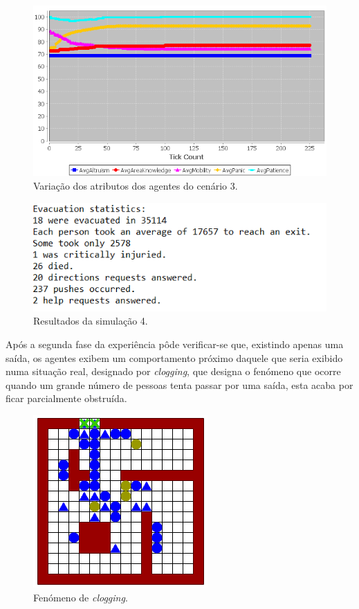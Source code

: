 \documentclass[12pt]{article}
\begin{document}
\begin{titlepage}
\begin{itemize}
\begin{figure}[H]
	\centering
	\includegraphics{graph_sc3.png}
	\caption{Variação dos atributos dos agentes do cenário 3.}
	\label{graph_sc3}
\end{figure}

\begin{figure}[H]
	\centering
	\includegraphics{log_sc4.png}
	\caption{Resultados da simulação 4.}
	\label{log_sc4}
\end{figure}

Após a segunda fase da experiência pôde verificar-se que, existindo apenas uma saída, os agentes exibem um comportamento próximo daquele que seria exibido numa situação real, designado por \textit{clogging}, que designa o fenómeno que ocorre quando um grande número de pessoas tenta passar por uma saída, esta acaba por ficar parcialmente obstruída. 

\begin{figure}[H]
	\centering
	\includegraphics[scale=1.1]{clogging.png}
	\caption{Fenómeno de \textit{clogging}.}
	\label{clog}
\end{figure}


\end{itemize}
\end{titlepage}
\end{document}
